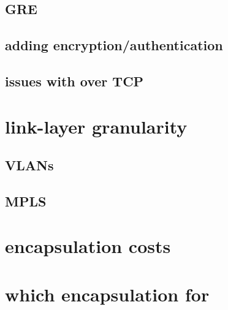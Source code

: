 


\subsection{GRE}




\subsection{adding encryption/authentication}


\subsection{issues with over TCP}


\section{link-layer granularity}



\subsection{VLANs}



\subsection{MPLS}



\section{encapsulation costs}


\section{which encapsulation for}


